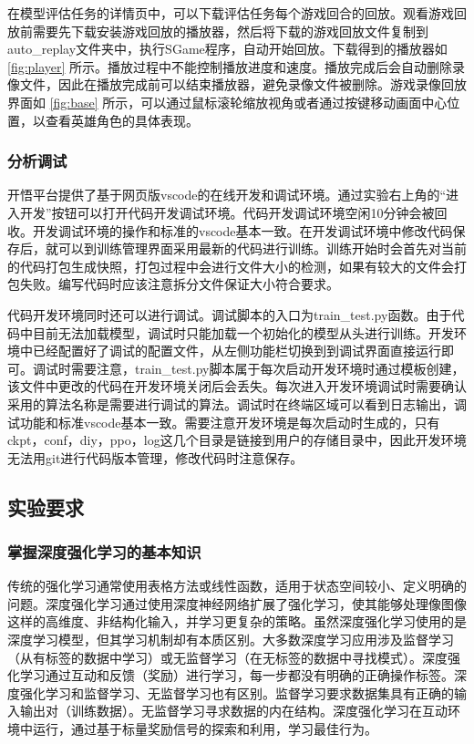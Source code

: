 在模型评估任务的详情页中，可以下载评估任务每个游戏回合的回放。观看游戏回放前需要先下载安装游戏回放的播放器，然后将下载的游戏回放文件复制到auto\_replay文件夹中，执行SGame程序，自动开始回放。下载得到的播放器如 \cref{fig:player} 所示。播放过程中不能控制播放进度和速度。播放完成后会自动删除录像文件，因此在播放完成前可以结束播放器，避免录像文件被删除。游戏录像回放界面如 \cref{fig:base} 所示，可以通过鼠标滚轮缩放视角或者通过按键移动画面中心位置，以查看英雄角色的具体表现。

\subsubsection{分析调试}
开悟平台提供了基于网页版vscode的在线开发和调试环境。通过实验右上角的“进入开发”按钮可以打开代码开发调试环境。代码开发调试环境空闲10分钟会被回收。开发调试环境的操作和标准的vscode基本一致。在开发调试环境中修改代码保存后，就可以到训练管理界面采用最新的代码进行训练。训练开始时会首先对当前的代码打包生成快照，打包过程中会进行文件大小的检测，如果有较大的文件会打包失败。编写代码时应该注意拆分文件保证大小符合要求。


代码开发环境同时还可以进行调试。调试脚本的入口为train\_test.py函数。由于代码中目前无法加载模型，调试时只能加载一个初始化的模型从头进行训练。开发环境中已经配置好了调试的配置文件，从左侧功能栏切换到到调试界面直接运行即可。调试时需要注意，train\_test.py脚本属于每次启动开发环境时通过模板创建，该文件中更改的代码在开发环境关闭后会丢失。每次进入开发环境调试时需要确认采用的算法名称是需要进行调试的算法。调试时在终端区域可以看到日志输出，调试功能和标准vscode基本一致。需要注意开发环境是每次启动时生成的，只有ckpt，conf，diy，ppo，log这几个目录是链接到用户的存储目录中，因此开发环境无法用git进行代码版本管理，修改代码时注意保存。

\subsection{实验要求}
\subsubsection{掌握深度强化学习的基本知识}

传统的强化学习通常使用表格方法或线性函数，适用于状态空间较小、定义明确的问题。深度强化学习通过使用深度神经网络扩展了强化学习，使其能够处理像图像这样的高维度、非结构化输入，并学习更复杂的策略。虽然深度强化学习使用的是深度学习模型，但其学习机制却有本质区别。大多数深度学习应用涉及监督学习（从有标签的数据中学习）或无监督学习（在无标签的数据中寻找模式）。深度强化学习通过互动和反馈（奖励）进行学习，每一步都没有明确的正确操作标签。深度强化学习和监督学习、无监督学习也有区别。监督学习要求数据集具有正确的输入输出对（训练数据）。无监督学习寻求数据的内在结构。深度强化学习在互动环境中运行，通过基于标量奖励信号的探索和利用，学习最佳行为。

